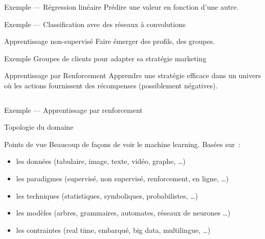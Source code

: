 \begin{frame}{Exemple --- Régression linéaire}
    Prédire une valeur en fonction d'une autre.
  
\end{frame}
  

\begin{frame}{Exemple --- Classification avec des réseaux à convolutions}
\end{frame}
  
\begin{frame}{Apprentissage non-supervisé}
  Faire émerger des profils, des groupes.
  \vfill
  \begin{exampleblock}{Exemple}
    Groupes de clients pour adapter sa stratégie marketing
  \end{exampleblock}
\end{frame}

\begin{frame}{Apprentissage par Renforcement}
  Apprendre une stratégie efficace dans un univers où les actions fournissent des récompenses (possiblement négatives).
  \vfill
  \begin{columns}[T]
    \begin{column}{0.5\textwidth}
    \end{column}
    \begin{column}{0.5\textwidth}
    \end{column}
  \end{columns}
\end{frame}

\begin{frame}{Exemple --- Apprentissage par renforcement}
\end{frame}

\begin{frame}{Topologie du domaine}
\end{frame}

\begin{frame}{Points de vue}
  Beaucoup de façons de voir le machine learning. Basées sur~:
  \begin{itemize}[<+->]
    \item les données (tabulaire, image, texte, vidéo, graphe, …)
    \item les paradigmes (supervisé, non supervisé, renforcement, en
      ligne, …)
    \item les techniques (statistiques, symboliques, probabilistes, …)
    \item les modèles (arbres, grammaires, automates, réseaux de
      neurones …)
    \item les contraintes (real time, embarqué, big data, multilingue,
      …)
  \end{itemize}
\end{frame}

